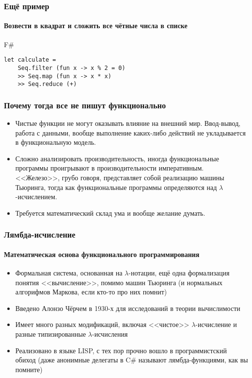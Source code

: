 \documentclass[xetex,mathserif,serif]{beamer}
\begin{document}
	\begin{frame}[fragile]
		\frametitle{Ещё пример}
		\framesubtitle{Возвести в квадрат и сложить все чётные числа в списке}
		\begin{exampleblock}{F\#}
			\begin{lstlisting}
let calculate = 
    Seq.filter (fun x -> x % 2 = 0) 
    >> Seq.map (fun x -> x * x) 
    >> Seq.reduce (+)
            \end{lstlisting}
		\end{exampleblock}
\end{frame}

	\begin{frame}
		\frametitle{Почему тогда все не пишут функционально}
		\begin{itemize}
			\item Чистые функции не могут оказывать влияние на внешний мир. Ввод-вывод, работа с данными,
					вообще выполнение каких-либо действий не укладывается в функциональную модель.
			\item Сложно анализировать производительность, иногда функциональные программы проигрывают
					в производительности императивным. <<Железо>>, грубо говоря, представляет собой 
					реализацию машины Тьюринга, тогда как функциональные программы определяются над
					$\lambda$-исчислением.
			\item Требуется математический склад ума и вообще желание думать.
		\end{itemize}
	\end{frame}

	\begin{frame}
		\frametitle{Лямбда-исчисление}
		\framesubtitle{Математическая основа функционального программирования}
		\begin{itemize}
			\item Формальная система, основанная на $\lambda$-нотации, ещё одна формализация
					понятия <<вычисление>>, помимо машин Тьюринга (и нормальных алгорифмов
					Маркова, если кто-то про них помнит)
			\item Введено Алонзо Чёрчем в 1930-х для исследований в теории вычислимости
			\item Имеет много разных модификаций, включая <<чистое>> $\lambda$-исчисление и
					разные типизированные $\lambda$-исчисления
			\item Реализовано в языке LISP, с тех пор прочно вошло в программистский обиход
					(даже анонимные делегаты в C\# называют лямбда-функциями, как вы помните)
		\end{itemize}
	\end{frame}
	
\end{document}
